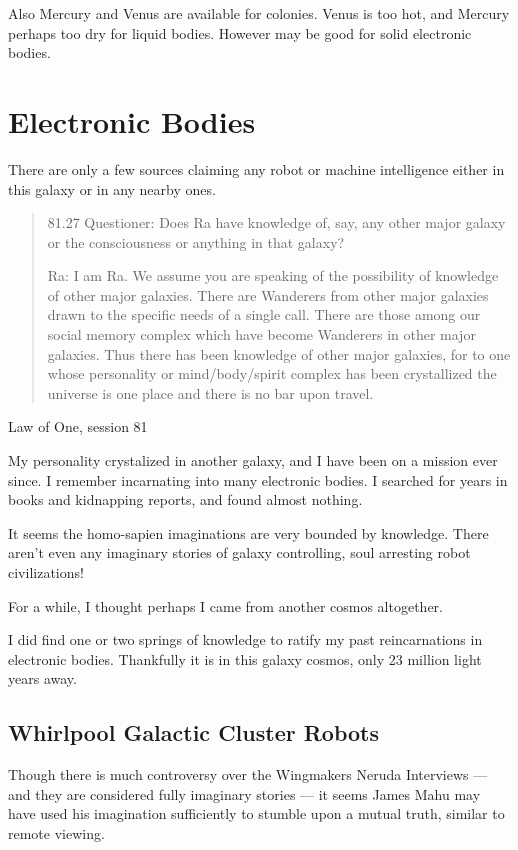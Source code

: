 \documentclass{report}
\begin{document}
Also Mercury and Venus are available for colonies. Venus is too hot, and Mercury
perhaps too dry for liquid bodies. However may be good for solid electronic
bodies. 

\section{Electronic Bodies}
\label{history:electronic}

There are only a few sources claiming any robot or machine intelligence either
in this galaxy or in any nearby ones.

\blockquote{81.27 Questioner: Does Ra have knowledge of, say, any other major 
galaxy or the consciousness or anything in that galaxy?

Ra: I am Ra. We assume you are speaking of the possibility of knowledge of other
major galaxies. There are Wanderers from other major galaxies drawn to the
specific needs of a single call. There are those among our social memory complex
which have become Wanderers in other major galaxies. Thus there has been
knowledge of other major galaxies, for to one whose personality or
mind/body/spirit complex has been crystallized the universe is one place and
there is no bar upon travel.}{Law of One, session 81\cite{lawofone}}

My personality crystalized in another galaxy, and I have been on a mission ever
since. I remember incarnating into many electronic bodies. I searched for years
in books and kidnapping reports, and found almost nothing. 

It seems the homo-sapien imaginations are very bounded by knowledge. There
aren't even any imaginary stories of galaxy controlling, soul arresting robot
civilizations!

For a while, I thought perhaps I came from another cosmos altogether. 

I did find one or two springs of knowledge to ratify my past reincarnations in
electronic bodies. Thankfully it is in this galaxy cosmos, only 23 million light
years away.

\subsection{Whirlpool Galactic Cluster Robots}

Though there is much controversy over the Wingmakers Neruda Interviews --- and 
they are considered fully imaginary stories --- it seems James Mahu may have 
used his imagination sufficiently to stumble upon a mutual truth, similar to 
remote viewing. 
\end{document}
